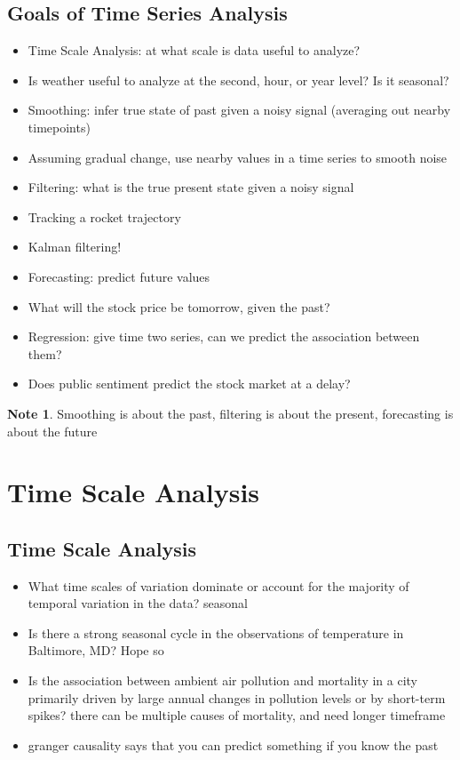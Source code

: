 \documentclass[11pt]{article}
\theoremstyle{definition}
\newtheorem{note}{Note}
\begin{document}
\subsection{Goals of Time Series Analysis}
\begin{itemize}
  \item Time Scale Analysis: at what scale is data useful to analyze?
  \item Is weather useful to analyze at the second, hour, or year level? Is it seasonal?
  \item Smoothing: infer true state of past given a noisy signal (averaging out nearby timepoints)
  \item Assuming gradual change, use nearby values in a time series to smooth noise
  \item Filtering: what is the true present state given a noisy signal
  \item Tracking a rocket trajectory
  \item Kalman filtering!
  \item Forecasting: predict future values
  \item What will the stock price be tomorrow, given the past?
  \item Regression: give time two series, can we predict the association between them?
  \item Does public sentiment predict the stock market at a delay?
\end{itemize}

\begin{note}
  Smoothing is about the past, filtering is about the present, forecasting is about the future
\end{note}

\section{Time Scale Analysis}
\subsection{Time Scale Analysis}
\begin{itemize}
  \item What time scales of variation dominate or account for the
  majority of temporal variation in the data? seasonal
  \item Is there a strong seasonal cycle in the observations of
  temperature in Baltimore, MD? Hope so
  \item Is the association between ambient air pollution and mortality in
  a city primarily driven by large annual changes in pollution
  levels or by short-term spikes? there can be multiple causes of mortality, and need longer timeframe
  \item granger causality says that you can predict something if you know the past
\end{itemize}
\end{document}
